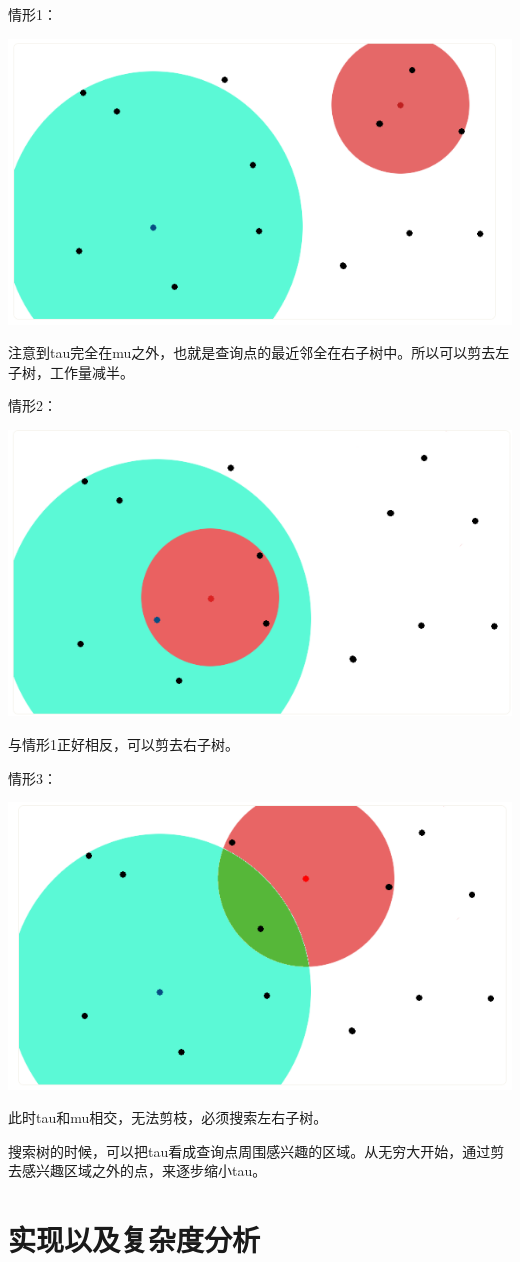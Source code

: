 \documentclass{ctexart}
\begin{document}
	情形1：
	
	\includegraphics[scale=0.5]{case1}
	
	注意到tau完全在mu之外，也就是查询点的最近邻全在右子树中。所以可以剪去左子树，工作量减半。
	
	情形2：
	
	\includegraphics[scale=0.5]{case2}
	
	与情形1正好相反，可以剪去右子树。
	
	情形3：
	
	\includegraphics[scale=0.5]{case3}
	
	此时tau和mu相交，无法剪枝，必须搜索左右子树。
	
	搜索树的时候，可以把tau看成查询点周围感兴趣的区域。从无穷大开始，通过剪去感兴趣区域之外的点，来逐步缩小tau。
	\section{实现以及复杂度分析}
	
\end{document}
